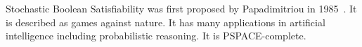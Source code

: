 Stochastic Boolean Satisfiability was first proposed by Papadimitriou in 1985~\cite{papadimitriou1985games}.
It is described as games against nature.
It has many applications in artificial intelligence including probabilistic reasoning.
It is PSPACE-complete.